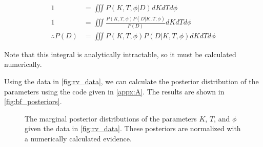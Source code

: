 \documentclass[preprint,longauthor]{aastex631}
\numberwithin{equation}{section}
\begin{document}
\begin{align}
  1 &= \iiint P(K,T,\phi|D) dK dT d\phi\nonumber \\
  1 &= \iiint \frac{P(K,T,\phi)P(D|K,T,\phi)}{P(D)} dK dT d\phi \nonumber \\
  \therefore P(D) &= \iiint P(K,T,\phi)P(D|K,T,\phi) dK dT d\phi
\end{align}

Note that this integral is analytically intractable, so it must be calculated numerically.

Using the data in \autoref{fig:rv_data}, we can calculate the posterior distribution of the parameters using the code given in \autoref{appx:A}. The results are shown in \autoref{fig:bf_posteriors}.

\begin{figure}[ht!]
\centering

\hfill
{}
\hfill
{}
\caption{The marginal posterior distributions of the parameters $K$, $T$, and $\phi$ given the data in \autoref{fig:rv_data}. These posteriors are normalized with a numerically calculated evidence.}
\label{fig:bf_posteriors}
\end{figure}
\end{document}
